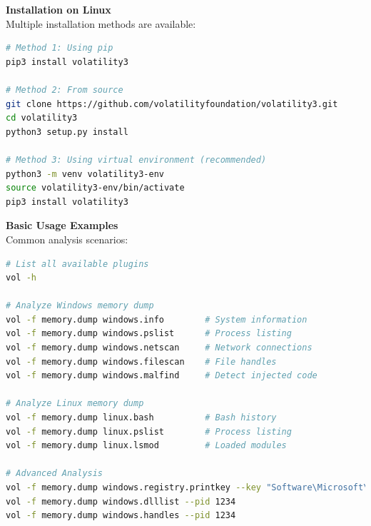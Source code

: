 \textbf{Installation on Linux}\\
Multiple installation methods are available:

\begin{lstlisting}[language=sh]
# Method 1: Using pip
pip3 install volatility3

# Method 2: From source
git clone https://github.com/volatilityfoundation/volatility3.git
cd volatility3
python3 setup.py install

# Method 3: Using virtual environment (recommended)
python3 -m venv volatility3-env
source volatility3-env/bin/activate
pip3 install volatility3
\end{lstlisting}

\textbf{Basic Usage Examples}\\
Common analysis scenarios:

\begin{lstlisting}[language=sh]
# List all available plugins
vol -h

# Analyze Windows memory dump
vol -f memory.dump windows.info        # System information
vol -f memory.dump windows.pslist      # Process listing
vol -f memory.dump windows.netscan     # Network connections
vol -f memory.dump windows.filescan    # File handles
vol -f memory.dump windows.malfind     # Detect injected code

# Analyze Linux memory dump
vol -f memory.dump linux.bash          # Bash history
vol -f memory.dump linux.pslist        # Process listing
vol -f memory.dump linux.lsmod         # Loaded modules

# Advanced Analysis
vol -f memory.dump windows.registry.printkey --key "Software\Microsoft\Windows\CurrentVersion\Run"
vol -f memory.dump windows.dlllist --pid 1234
vol -f memory.dump windows.handles --pid 1234
\end{lstlisting}

